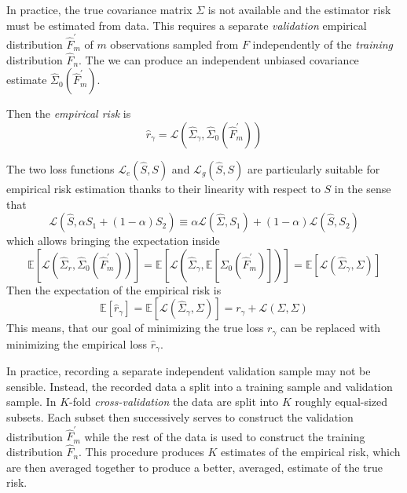 In practice, the true covariance matrix $\Sigma$ is not available and the estimator risk must be estimated from data. This requires a separate \emph{validation} empirical distribution $\hat F_m^\prime$ of $m$ observations sampled from $F$ independently of the \emph{training} distribution $\hat F_n$. The we can produce an independent unbiased covariance estimate $\hat \Sigma_0(\hat F_m^\prime)$.

Then the \emph{empirical risk} is 
\begin{equation}
\hat r_\gamma = \mathcal L\left(\hat\Sigma_\gamma,\hat\Sigma_0(\hat F_m^\prime)\right) 
\end{equation}

 The two loss functions $\mathcal L_e(\hat S,S)$ and $\mathcal L_g(\hat S,S)$ are particularly suitable for empirical risk estimation thanks to their linearity with respect to $S$ in the sense that 
\begin{equation}
\mathcal L\left(\hat S,\alpha S_1 + (1-\alpha)S_2\right) 
\equiv 
\alpha\mathcal L(\hat\Sigma,S_1) + (1-\alpha)\mathcal L(\hat S,S_2)
\end{equation}
which allows bringing the expectation inside 
\begin{equation}
\mathbb E\left[ \mathcal L\left(\hat\Sigma_r, \hat\Sigma_0(\hat F_m^\prime)\right) \right] 
=
\mathbb E\left[ \mathcal L\left(\hat\Sigma_\gamma, \mathbb E\left[\Sigma_0(\hat F_m^\prime)\right]\right) \right] 
=
\mathbb E\left[ \mathcal L\left(\hat\Sigma_\gamma, \Sigma\right) \right] 
\end{equation}
Then the expectation of the empirical risk is 
\begin{equation}
\mathbb E\left[\hat r_\gamma\right] 
= \mathbb E\left[\mathcal L(\hat\Sigma_\gamma,\Sigma)\right]
= r_\gamma + \mathcal L(\Sigma,\Sigma)
\end{equation}
This means, that our goal of minimizing the true loss $r_\gamma$ can be replaced with minimizing  the empirical loss $\hat r_\gamma$.

In practice, recording a separate independent validation sample may not be sensible.  Instead, the recorded data a split into a training sample and validation sample. In $K$-fold \emph{cross-validation} the data are split into $K$ roughly equal-sized subsets. Each subset then successively serves to construct the validation distribution $\hat F_m^\prime$  while the rest of the data is used to construct the training distribution $\hat F_n$.  This procedure produces $K$ estimates of the empirical risk, which are then averaged together to produce a better, averaged, estimate of the true risk.

